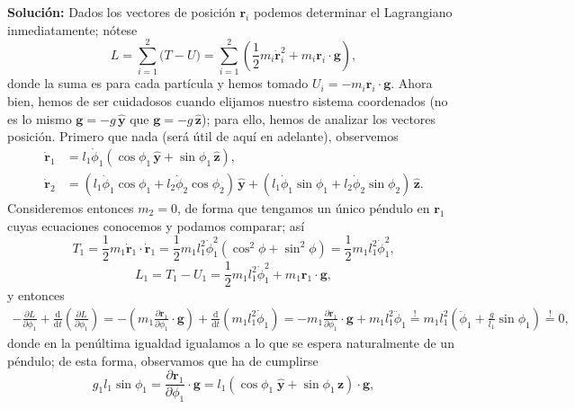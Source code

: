 \documentclass{article}
\begin{document}
\textcolor{Cinnabar}{\textbf{Soluci\'on:}} Dados los vectores de posici\'on $\mathbf{r}_i$ podemos determinar el Lagrangiano inmediatamente; n\'otese
\begin{equation}
    L=\sum_{i=1}^{2}\bigl(T-U\bigr)=\sum_{i=1}^{2}\left(\frac{1}{2}m_i\mathbf{\dot{r}}_i^2+m_i\mathbf{r}_i\cdot\mathbf{g}\right),
\end{equation}
donde la suma es para cada part\'icula y hemos tomado $U_i=-m_i\mathbf{r}_i\cdot\mathbf{g}$. Ahora bien, hemos de ser cuidadosos cuando elijamos nuestro sistema coordenados (no es lo mismo $\mathbf{g}=-g\,\mathbf{\hat{y}}$ que $\mathbf{g}=-g\,\mathbf{\hat{z}}$); para ello, hemos de analizar los vectores posici\'on. Primero que nada (ser\'a \'util de aqu\'i en adelante), observemos
\begin{align}
    \mathbf{\dot{r}}_1&=l_1\dot{\phi}_1(\cos\phi_1\,\mathbf{\hat{y}}+\sin\phi_1\,\mathbf{\hat{z}}), \\
    \mathbf{\dot{r}}_2&=(l_1\dot{\phi}_1\cos\phi_1+l_2\dot{\phi}_2\cos\phi_2)\,\mathbf{\hat{y}}+(l_1\dot{\phi}_1\sin\phi_1+l_2\dot{\phi}_2\sin\phi_2)\,\mathbf{\hat{z}}.
\end{align}
Consideremos entonces $m_2=0$, de forma que tengamos un \'unico p\'endulo en $\mathbf{r}_1$ cuyas ecuaciones conocemos y podamos comparar; as\'i
\begin{equation*}
    T_1 =\frac{1}{2}m_1\mathbf{\dot{r}}_1\cdot\mathbf{\dot{r}}_1
    =\frac{1}{2}m_1l_1^2\dot{\phi}^2_1\left(\cos^2\phi+\sin^2\phi\right)
    =\frac{1}{2}m_1l_1^2\dot{\phi}^2_1,
\end{equation*}
\begin{equation*}
    L_1=T_1-U_1=\frac{1}{2}m_1 l_1^2 \dot{\phi}^2_1+m_1\mathbf{r}_1\cdot\mathbf{g},
\end{equation*}
y entonces
\begin{align*}
    -\frac{\partial L}{\partial \phi_1}+\frac{\mathrm{d}}{\mathrm{d}t}\left(\frac{\partial L}{\partial \phi_1}\right)
    =-\left(m_1\frac{\partial \mathbf{r}_1}{\partial\phi_1}\cdot\mathbf{g}\right)+\frac{\mathrm{d}}{\mathrm{d}t}\left(m_1 l_1^2 \dot{\phi}_1\right)
    =-m_1\frac{\partial\mathbf{r}_1}{\partial\phi_1}\cdot\mathbf{g}+m_1l_1^2\ddot{\phi}_1
    \overset{!}=m_1l_1^2\left(\ddot{\phi}_1+\frac{g}{l_1}\sin\phi_1\right)
    \overset{!}=0,
\end{align*}
donde en la pen\'ultima igualdad igualamos a lo que se espera naturalmente de un p\'endulo; de esta forma, observamos que ha de cumplirse
\begin{equation}
    g_1l_1\sin\phi_1=\frac{\partial \mathbf{r}_1}{\partial \phi_1}\cdot\mathbf{g}=l_1(\cos\phi_1\;\mathbf{\hat{y}}+\sin\phi_1\,\mathbf{z})\cdot\mathbf{g},
\end{equation}
\end{document}
